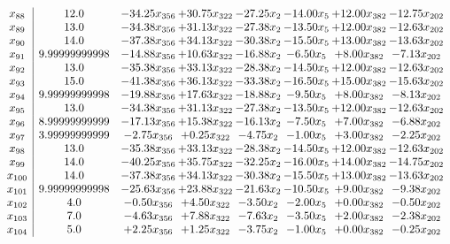 \documentclass[8pt]{article}
\begin{document}
\[\begin{array}{c| c c@{\hskip 2pt} c@{\hskip 2pt} c@{\hskip 2pt} c@{\hskip 2pt} c@{\hskip 2pt} c@{\hskip 2pt} }
 x_{88}   &  12.0 & -34.25 x_{356} & + 30.75 x_{322} & -27.25 x_{2} & -14.00 x_{5} & + 12.00 x_{382} & -12.75 x_{202}\\
 x_{89}   &  13.0 & -34.38 x_{356} & + 31.13 x_{322} & -27.38 x_{2} & -13.50 x_{5} & + 12.00 x_{382} & -12.63 x_{202}\\
 x_{90}   &  14.0 & -37.38 x_{356} & + 34.13 x_{322} & -30.38 x_{2} & -15.50 x_{5} & + 13.00 x_{382} & -13.63 x_{202}\\
 x_{91}   &  9.99999999998 & -14.88 x_{356} & + 10.63 x_{322} & -16.88 x_{2} & -6.50 x_{5} & +  8.00 x_{382} & -7.13 x_{202}\\
 x_{92}   &  13.0 & -35.38 x_{356} & + 33.13 x_{322} & -28.38 x_{2} & -14.50 x_{5} & + 12.00 x_{382} & -12.63 x_{202}\\
 x_{93}   &  15.0 & -41.38 x_{356} & + 36.13 x_{322} & -33.38 x_{2} & -16.50 x_{5} & + 15.00 x_{382} & -15.63 x_{202}\\
 x_{94}   &  9.99999999998 & -19.88 x_{356} & + 17.63 x_{322} & -18.88 x_{2} & -9.50 x_{5} & +  8.00 x_{382} & -8.13 x_{202}\\
 x_{95}   &  13.0 & -34.38 x_{356} & + 31.13 x_{322} & -27.38 x_{2} & -13.50 x_{5} & + 12.00 x_{382} & -12.63 x_{202}\\
 x_{96}   &  8.99999999999 & -17.13 x_{356} & + 15.38 x_{322} & -16.13 x_{2} & -7.50 x_{5} & +  7.00 x_{382} & -6.88 x_{202}\\
 x_{97}   &  3.99999999999 & -2.75 x_{356} & +  0.25 x_{322} & -4.75 x_{2} & -1.00 x_{5} & +  3.00 x_{382} & -2.25 x_{202}\\
 x_{98}   &  13.0 & -35.38 x_{356} & + 33.13 x_{322} & -28.38 x_{2} & -14.50 x_{5} & + 12.00 x_{382} & -12.63 x_{202}\\
 x_{99}   &  14.0 & -40.25 x_{356} & + 35.75 x_{322} & -32.25 x_{2} & -16.00 x_{5} & + 14.00 x_{382} & -14.75 x_{202}\\
 x_{100}   &  14.0 & -37.38 x_{356} & + 34.13 x_{322} & -30.38 x_{2} & -15.50 x_{5} & + 13.00 x_{382} & -13.63 x_{202}\\
 x_{101}   &  9.99999999998 & -25.63 x_{356} & + 23.88 x_{322} & -21.63 x_{2} & -10.50 x_{5} & +  9.00 x_{382} & -9.38 x_{202}\\
 x_{102}   &  4.0 & -0.50 x_{356} & +  4.50 x_{322} & -3.50 x_{2} & -2.00 x_{5} & +  0.00 x_{382} & -0.50 x_{202}\\
 x_{103}   &  7.0 & -4.63 x_{356} & +  7.88 x_{322} & -7.63 x_{2} & -3.50 x_{5} & +  2.00 x_{382} & -2.38 x_{202}\\
 x_{104}   &  5.0 & +  2.25 x_{356} & +  1.25 x_{322} & -3.75 x_{2} & -1.00 x_{5} & +  0.00 x_{382} & -0.25 x_{202}\\

\end{array}\]
\end{document}
